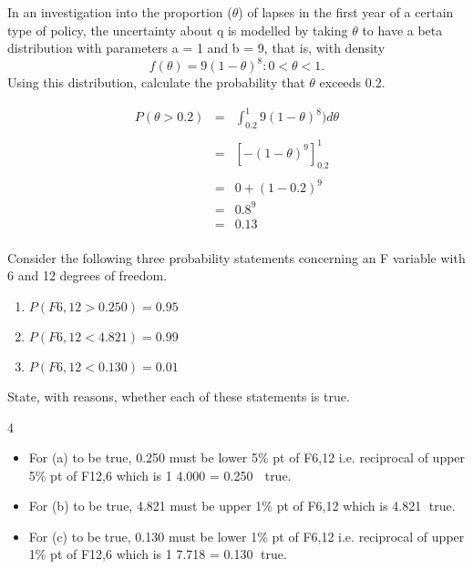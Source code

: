 \documentclass[a4paper,12pt]{article}
\begin{document}
\large
\noindent In an investigation into the proportion ($\theta$) of lapses in the first year of a
certain type of policy, the uncertainty about q is modelled by taking $\theta$ to have a
beta distribution with parameters a = 1 and b = 9, that is, with density
\[f(\theta) = 9(1 - \theta)^8 : 0 < \theta < 1.\]
Using this distribution, calculate the probability that $\theta$ exceeds 0.2. 


{
\large
\begin{eqnarray*}
P(\theta > 0.2) &=& \int^{1}_{0.2} 9(1- \theta)^8) d \theta \\
& & \\
&=& \left[ -(1-\theta)^9  \right]^{1}_{0.2}\\
& & \\
&=& 0 + (1 - 0.2)^9 \\ 
&=& 0.8^9 \\
&=& 0.13\\
\end{eqnarray*}
}

\newpage
Consider the following three probability statements concerning an F variable
with 6 and 12 degrees of freedom.
\begin{enumerate}
\item $P(F6,12 > 0.250) = 0.95$
\item $P(F6,12 < 4.821) = 0.99$
\item $P(F6,12 < 0.130) = 0.01$
\end{enumerate}

State, with reasons, whether each of these statements is true. 


4 
\begin{itemize}
\item For (a) to be true, 0.250 must be lower 5\% pt of F6,12 i.e. reciprocal of upper 5\% pt
of F12,6 which is
1
4.000
= 0.250  true.
    \item For (b) to be true, 4.821 must be upper 1\% pt of F6,12 which is 4.821 true.
\item For (c) to be true, 0.130 must be lower 1\% pt of F6,12 i.e. reciprocal of upper 1\% pt
of F12,6 which is
1
7.718
= 0.130 true.

\end{itemize}
\end{document}
